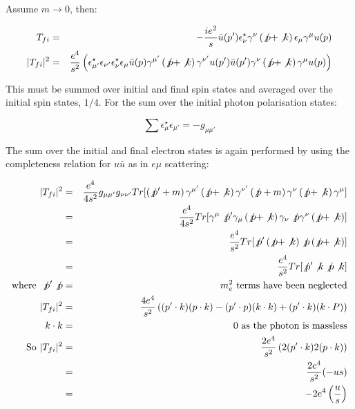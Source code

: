 Assume $m \to 0$, then:

\begin{eqnarray*}
  T_{fi}     & = & -\frac{ie^2}{s}\bar{u}(p')\epsilon^{\star}_{\nu}\gamma^{\nu}\left(\not{p} + \not{k}\right)\epsilon_{\mu}\gamma^{\mu}u(p) \\
  |T_{fi}|^2 & = & \frac{e^4}{s^2}\left(\epsilon^{\star}_{\mu'}\epsilon_{\nu'}\epsilon^{\star}_{\nu}\epsilon_{\mu}\bar{u}(p)\gamma^{\mu'}\left(\not{p} + \not{k}\right)\gamma^{\nu'}u(p')\bar{u}(p')\gamma^{\nu}\left(\not{p} + \not{k}\right)\gamma^{\mu}u(p)\right)
\end{eqnarray*}

This must be summed over initial and final spin states and averaged over the initial spin states, $1/4$.  For the sum over the initial photon polarisation states:

\[
  \sum\epsilon^{\star}_{\mu}\epsilon_{\mu'} = -g_{\mu\mu'}
\]

The sum over the initial and final electron states is again performed by using the completeness relation for $u\bar{u}$ as in $e\mu$ scattering:

\begin{eqnarray*}
  |T_{fi}|^2 & = & \frac{e^4}{4s^2}g_{\mu\mu'}g_{\nu\nu'}Tr[\left(\not{p}' + m\right)\gamma^{\mu'}\left(\not{p} + \not{k}\right)\gamma^{\nu'}\left(\not{p} + m\right)\gamma^{\nu}\left(\not{p} + \not{k}\right)\gamma^{\mu}] \\
  & = & \frac{e^4}{4s^2}Tr[\gamma^{\mu}\not{p}'\gamma_{\mu}\left(\not{p} + \not{k}\right)\gamma_{\nu}\not{p}\gamma^{\nu}\left(\not{p} + \not{k}\right)] \\
  & = & \frac{e^4}{s^2}Tr[\not{p}'\left(\not{p} + \not{k}\right) \not{p}\left(\not{p} + \not{k}\right)] \\
  & = & \frac{e^4}{s^2}Tr[\not{p}'\not{k}\not{p}\not{k}] \\
  \textrm{where } \not{p}'\not{p} & = & m^2_{e} \textrm{ terms have been neglected} \\
  |T_{fi}|^2 & = & \frac{4e^4}{s^2}\left((p'\cdot k)(p\cdot k) - (p'\cdot p)(k\cdot k) + (p'\cdot k)(k\cdot P)\right) \\
  k\cdot k & = & 0 \textrm{ as the photon is massless} \\
  \textrm{So } |T_{fi}|^2 & = & \frac{2e^4}{s^2}\left(2(p'\cdot k)2(p\cdot k)\right) \\
  & = & \frac{2e^4}{s^2}(-us) \\
  & = & -2e^4\left(\frac{u}{s}\right)
\end{eqnarray*}

